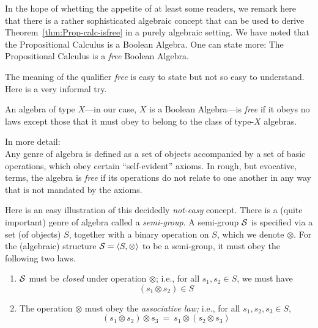 In the hope of whetting the appetite of at least some readers, we remark here that there is a rather sophisticated algebraic concept that can be used to derive Theorem~\ref{thm:Prop-calc-isfree} in a purely algebraic setting.  We have noted that the Propositional Calculus is a Boolean Algebra.  One can state more:  The Propositional Calculus is a {\em free} Boolean Algebra.

\smallskip

The meaning of the qualifier {\it free} is easy to state but not so easy to understand.  Here is a very informal try.

\smallskip

An algebra of type $X$---in our case, $X$ is a Boolean Algebra---is {\em free} if it obeys no laws except those that it must obey to belong to the class of type-$X$ algebras.

\smallskip


\noindent
In more detail: \\
Any genre of algebra is defined as a set of objects accompanied by a set of basic operations, which obey certain ``self-evident'' axioms.  In rough, but evocative, terms, the algebra is {\em free} if its operations do not relate to one another in any way that is not mandated by the axioms.

\smallskip

 

Here is an easy illustration of this decidedly {\em not-easy} concept.  There is a (quite important) genre of algebra called a {\it semi-group}.  A semi-group $\mbox{$\cal S$}$ is specified via a set (of objects) $S$, together with a binary operation on $S$, which we denote $\otimes$.  For the (algebraic) structure $\mbox{$\cal S$} = \langle S, \otimes \rangle$ to be a semi-group, it must obey the following two laws.
\begin{enumerate}
\item
$\mbox{$\cal S$}$ must be {\it closed} under operation $\otimes$; i.e., for all $s_1, s_2 \in S$, we must have
\[ (s_1 \otimes s_2) \in S \]
\medskip\item
The operation $\otimes$ must obey the {\em associative law;} i.e., for all $s_1, s_2, s_3 \in S$,
\[ (s_1 \otimes s_2) \otimes s_3 \ = \ s_1 \otimes (s_2 \otimes s_3) \]
\end{enumerate}

